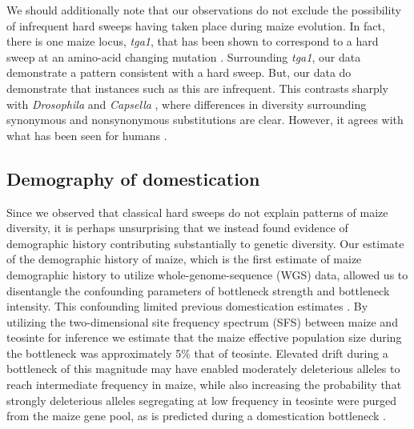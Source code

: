 \documentclass{pnastwo}
\begin{document}
\begin{article}
We should additionally note that our observations do not exclude the possibility of infrequent hard sweeps having taken place during maize evolution. In fact, there is one maize locus, \emph{tga1}, that has been shown to correspond to a hard sweep at an amino-acid changing mutation \cite{wang2015}. Surrounding \emph{tga1},  our data demonstrate a pattern consistent with a hard sweep. But, our data do demonstrate that instances such as this are infrequent. This contrasts sharply with \emph{Drosophila} \cite{sattath2011} and \emph{Capsella} \cite{williamson2014}, where differences in diversity surrounding synonymous and nonsynonymous substitutions are clear. However, it agrees with what has been seen for humans \cite{hernandez2011}. 

\subsection{Demography of domestication}
Since we observed that classical hard sweeps do not explain patterns of maize diversity, it is perhaps unsurprising that we instead found evidence of demographic history contributing substantially to genetic diversity. Our estimate of the demographic history of maize, which is the first estimate of maize demographic history to utilize whole-genome-sequence (WGS) data, allowed us to disentangle the confounding parameters of bottleneck strength and bottleneck intensity. This confounding limited previous domestication estimates \cite{wright2005}. By utilizing the two-dimensional site frequency spectrum (SFS) between maize and teosinte for inference \cite{gutenkunst2009} we estimate that the maize effective population size during the bottleneck was approximately 5\% that of teosinte. Elevated drift during a bottleneck of this magnitude may have enabled moderately deleterious alleles to reach intermediate frequency in maize, while also increasing the probability that strongly deleterious alleles segregating at low frequency in teosinte were purged from the maize gene pool, as is predicted during a domestication bottleneck \cite{somebody}.


\end{article}
\end{document}

